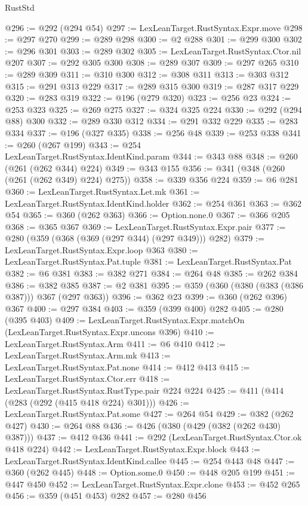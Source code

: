 \begin{lexlean}{RustStd}
\begin{coremodule}
@296 := @292 (@294 @54)
@297 := LexLeanTarget.RustSyntax.Expr.move
@298 := @297 @270
@299 := @289 @298
@300 := @2 @288
@301 := @299 @300
@302 := @296 @301
@303 := @289 @302
@305 := LexLeanTarget.RustSyntax.Ctor.nil @207
@307 := @292 @305 @300
@308 := @289 @307
@309 := @297 @265
@310 := @289 @309
@311 := @310 @300
@312 := @308 @311
@313 := @303 @312
@315 := @291 @313 @229
@317 := @289 @315 @300
@319 := @287 @317 @229
@320 := @283 @319
@322 := @196 (@279 @320)
@323 := @256 @23
@324 := @253 @323
@325 := @269 @275
@327 := @324 @325 @224
@330 := @292 (@294 @88) @300
@332 := @289 @330 @312
@334 := @291 @332 @229
@335 := @283 @334
@337 := @196 (@327 @335)
@338 := @256 @48
@339 := @253 @338
@341 := @260 (@267 @199)
@343 := @254 LexLeanTarget.RustSyntax.IdentKind.param
@344 := @343 @88
@348 := @260 (@261 (@262 @344) @224)
@349 := @343 @155
@356 := @341 (@348 (@260 (@261 (@262 @349) @224) @275))
@358 := @339 @356 @224
@359 := @6 @281
@360 := LexLeanTarget.RustSyntax.Let.mk
@361 := LexLeanTarget.RustSyntax.IdentKind.holder
@362 := @254 @361
@363 := @362 @54
@365 := @360 (@262 @363)
@366 := Option.none.{0}
@367 := @366 @205
@368 := @365 @367
@369 := LexLeanTarget.RustSyntax.Expr.pair
@377 := @280 (@359 (@368 (@369 (@297 @344) (@297 @349))) @282)
@379 := LexLeanTarget.RustSyntax.Expr.loop @363
@380 := LexLeanTarget.RustSyntax.Pat.tuple
@381 := LexLeanTarget.RustSyntax.Pat
@382 := @6 @381
@383 := @382 @271
@384 := @264 @48
@385 := @262 @384
@386 := @382 @385
@387 := @2 @381
@395 := @359 (@360 (@380 (@383 (@386 @387))) @367 (@297 @363))
@396 := @362 @23
@399 := @360 (@262 @396) @367
@400 := @297 @384
@403 := @359 (@399 @400) @282
@405 := @280 (@395 @403)
@409 := LexLeanTarget.RustSyntax.Expr.matchOn (LexLeanTarget.RustSyntax.Expr.uncons @396)
@410 := LexLeanTarget.RustSyntax.Arm
@411 := @6 @410
@412 := LexLeanTarget.RustSyntax.Arm.mk
@413 := LexLeanTarget.RustSyntax.Pat.none
@414 := @412 @413
@415 := LexLeanTarget.RustSyntax.Ctor.err
@418 := LexLeanTarget.RustSyntax.RustType.pair @224 @224
@425 := @411 (@414 (@283 (@292 (@415 @418 @224) @301)))
@426 := LexLeanTarget.RustSyntax.Pat.some
@427 := @264 @54
@429 := @382 (@262 @427)
@430 := @264 @88
@436 := @426 (@380 (@429 (@382 (@262 @430) @387)))
@437 := @412 @436
@441 := @292 (LexLeanTarget.RustSyntax.Ctor.ok @418 @224)
@442 := LexLeanTarget.RustSyntax.Expr.block
@443 := LexLeanTarget.RustSyntax.IdentKind.callee
@445 := @254 @443 @48
@447 := @360 (@262 @445)
@448 := Option.some.{0}
@450 := @448 @205 @199
@451 := @447 @450
@452 := LexLeanTarget.RustSyntax.Expr.clone
@453 := @452 @265
@456 := @359 (@451 @453) @282
@457 := @280 @456

\end{coremodule}
\end{lexlean}

